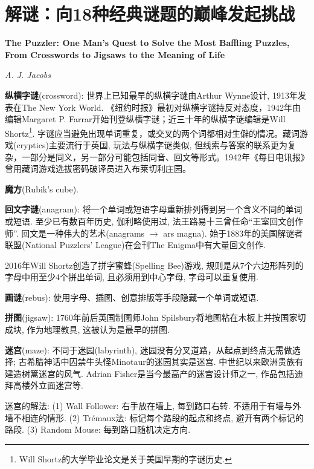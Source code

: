 \chapter{解谜：向18种经典谜题的巅峰发起挑战}
\Large\textbf{The Puzzler: One Man's Quest to Solve the Most Baffling Puzzles, From Crosswords to Jigsaws to the Meaning of Life}
\par \emph{A. J. Jacobs}\normalsize

\par \textbf{纵横字谜}(crossword): 世界上已知最早的纵横字谜由Arthur Wynne设计, 1913年发表在The New York World. 《纽约时报》最初对纵横字谜持反对态度，1942年由编辑Margaret P. Farrar开始刊登纵横字谜；近三十年的纵横字谜编辑是Will Shortz\footnote{Will Shortz的大学毕业论文是关于美国早期的字谜历史. }. 字谜应当避免出现单词重复，或交叉的两个词都相对生僻的情况。藏词游戏(cryptics)主要流行于英国, 玩法与纵横字谜类似, 但线索与答案的联系更为复杂，一部分是同义，另一部分可能包括同音、回文等形式。1942年《每日电讯报》曾用藏词游戏选拔密码破译员进入布莱切利庄园。

\par \textbf{魔方}(Rubik's cube).

\par \textbf{回文字谜}(anagram): 将一个单词或短语字母重新排列得到另一个含义不同的单词或短语. 至少已有数百年历史, 伽利略使用过, 法王路易十三曾任命“王室回文创作师”. 回文是一种伟大的艺术(anagrams $\to$ ars magna). 始于1883年的美国解谜者联盟(National Puzzlers' League)在会刊The Enigma中有大量回文创作. 

\par 2016年Will Shortz创造了拼字蜜蜂(Spelling Bee)游戏, 规则是从7个六边形阵列的字母中用至少4个拼出单词, 且必须用到中心字母, 字母可以重复使用. 

\par \textbf{画谜}(rebus): 使用字母、插图、创意排版等手段隐藏一个单词或短语. 

\par \textbf{拼图}(jigsaw): 1760年前后英国制图师John Spilsbury将地图粘在木板上并按国家切成块, 作为地理教具, 这被认为是最早的拼图. 

\par \textbf{迷宫}(maze): 不同于迷园(labyrinth), 迷园没有分叉道路，从起点到终点无需做选择; 古希腊神话中囚禁牛头怪Minotaur的迷园其实是迷宫. 中世纪以来欧洲贵族有建造树篱迷宫的风气. Adrian Fisher是当今最高产的迷宫设计师之一, 作品包括迪拜高楼外立面迷宫等. 
\par 迷宫的解法: (1) Wall Follower: 右手放在墙上, 每到路口右转. 不适用于有墙与外墙不相连的情形. (2) Trémaux法: 标记每个路段的起点和终点, 避开有两个标记的路段. (3) Random Mouse: 每到路口随机决定方向. 

